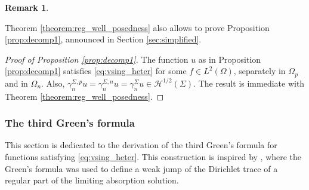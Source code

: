 \documentclass[report]{elsarticle}
\newtheorem{remark}[theorem]{Remark}
\numberwithin{theorem}{section}
\begin{document}
\begin{remark}
\end{remark}
Theorem \ref{theorem:reg_well_posedness} also allows to prove Proposition \ref{prop:decomp1}, announced in Section \ref{sec:simplified}. 
\begin{proof}[Proof of Proposition \ref{prop:decomp1}]
	The function $u$ as in Proposition \ref{prop:decomp1} satisfies \eqref{eq:vsing_heter} for some $f\in L^2(\Omega)$, separately in $\Omega_p$ and in $\Omega_n$. Also,  $\gamma_n^{\Sigma,p}u=\gamma_n^{\Sigma,n}u=\gamma_n^{\Sigma}u\in \mathcal{H}^{1/2}(\Sigma)$. The result is immediate with Theorem \ref{theorem:reg_well_posedness}.
\end{proof}
\subsubsection{The third Green's formula}
\label{sec:green_formula}
This section is dedicated to the derivation of the third Green's formula for functions satisfying \eqref{eq:vsing_heter}. This construction is inspired by \cite{ciarlet_mk_peillon}, where the Green's formula was used to define a weak jump of the Dirichlet trace of a regular part of the limiting absorption solution.  
\end{document}
